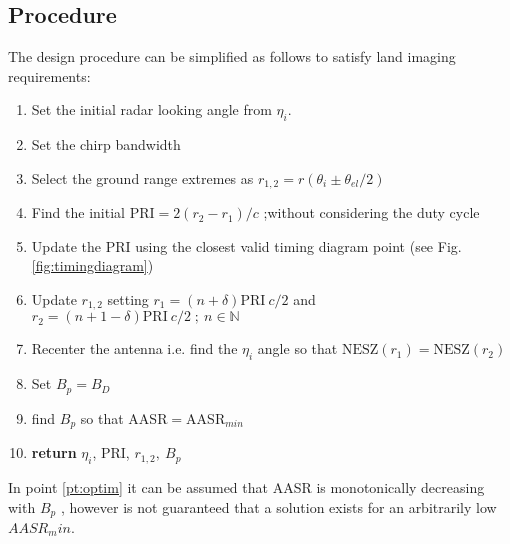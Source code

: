 \documentclass[conference,a4paper]{IEEEtran}
\begin{document}
    \subsection{Procedure}
    \label{subsec:psiproc}
    The design procedure can be simplified as follows to satisfy land imaging requirements:
    \begin{enumerate}
        \item Set the initial radar looking angle from $\eta_i$.
        \item Set the chirp bandwidth
        \item Select the ground range extremes as $r_{1,2} = r(\theta_i \pm \theta_{el}/2)$
        \item Find the initial $\text{PRI} = 2(r_2 - r_1) / c $ ;without considering the duty cycle
        \item Update the PRI using the closest valid timing diagram point (see Fig. \ref{fig:timingdiagram})
        \item Update $r_{1,2}$ setting $r_{1} = (n + \delta)\text{PRI}\ c / 2 $  and\\ $r_2 = (n + 1 - \delta)\text{PRI}\ c / 2\; ;\ n\in \mathbb{N}$
        \item Recenter the antenna i.e. find the $\eta_i$ angle so that $\text{NESZ}(r_1) = \text{NESZ}(r_2)$
        \item Set $B_p = B_D$
        \item find $B_p$ so that AASR$=$AASR$_{min}$ \label{pt:optim}
        \item \textbf{return} $\eta_i$, PRI, $r_{1,2},\  B_p$
    \end{enumerate}
    In point \ref{pt:optim} it can be assumed that AASR is monotonically decreasing with $B_p$ \cite{freeman2018design}, however is not guaranteed that a solution exists for an arbitrarily low $AASR_min$.
\end{document}
